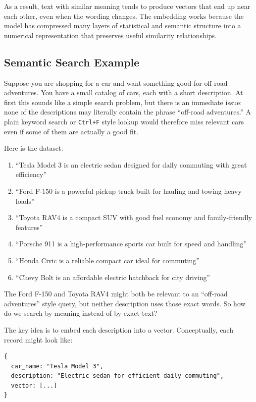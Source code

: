 \documentclass[12pt]{article}
\begin{document}
As a result, text with similar meaning tends to produce vectors that end
up near each other, even when the wording changes. The embedding works
because the model has compressed many layers of statistical and semantic
structure into a numerical representation that preserves useful similarity
relationships.

\subsection{Semantic Search Example}

Suppose you are shopping for a car and want something good for
off-road adventures. You have a small catalog of cars, each with a short
description. At first this sounds like a simple search problem, but there
is an immediate issue: none of the descriptions may literally contain the
phrase ``off-road adventures.'' A plain keyword search or \texttt{Ctrl+F}
style lookup would therefore miss relevant cars even if some of them are
actually a good fit.

Here is the dataset:

\begin{enumerate}
    \item ``Tesla Model 3 is an electric sedan designed for daily commuting with great efficiency''
    \item ``Ford F-150 is a powerful pickup truck built for hauling and towing heavy loads''
    \item ``Toyota RAV4 is a compact SUV with good fuel economy and family-friendly features''
    \item ``Porsche 911 is a high-performance sports car built for speed and handling''
    \item ``Honda Civic is a reliable compact car ideal for commuting''
    \item ``Chevy Bolt is an affordable electric hatchback for city driving''
\end{enumerate}

The Ford F-150 and Toyota RAV4 might both be relevant to an
``off-road adventures'' style query, but neither description uses those
exact words. So how do we search by meaning instead of by exact text?

The key idea is to embed each description into a vector. Conceptually,
each record might look like:

\begin{verbatim}
{
  car_name: "Tesla Model 3",
  description: "Electric sedan for efficient daily commuting",
  vector: [...] 
}
\end{verbatim}
\end{document}

